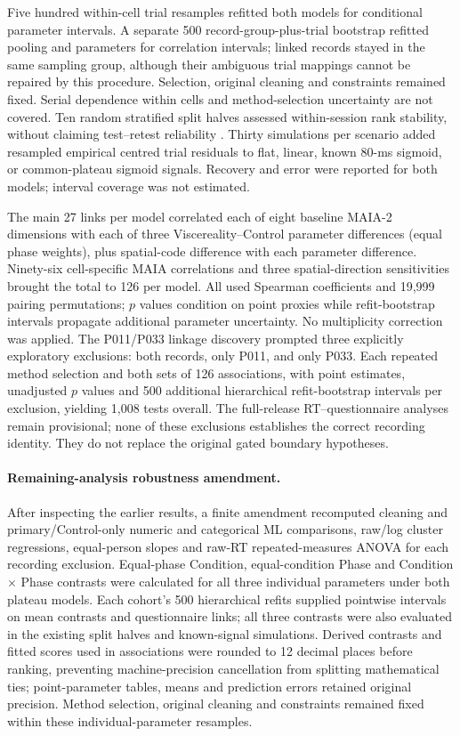 Five hundred within-cell trial resamples refitted both models for conditional parameter intervals. A separate 500 record-group-plus-trial bootstrap refitted pooling and parameters for correlation intervals; linked records stayed in the same sampling group, although their ambiguous trial mappings cannot be repaired by this procedure. Selection, original cleaning and constraints remained fixed. Serial dependence within cells and method-selection uncertainty are not covered. Ten random stratified split halves assessed within-session rank stability, without claiming test--retest reliability \citep{Hedge2018}. Thirty simulations per scenario added resampled empirical centred trial residuals to flat, linear, known 80-ms sigmoid, or common-plateau sigmoid signals. Recovery and error were reported for both models; interval coverage was not estimated.

The main 27 links per model correlated each of eight baseline MAIA-2 dimensions with each of three Viscereality--Control parameter differences (equal phase weights), plus spatial-code difference with each parameter difference. Ninety-six cell-specific MAIA correlations and three spatial-direction sensitivities brought the total to 126 per model. All used Spearman coefficients and 19{,}999 pairing permutations; $p$ values condition on point proxies while refit-bootstrap intervals propagate additional parameter uncertainty. No multiplicity correction was applied. The P011/P033 linkage discovery prompted three explicitly exploratory exclusions: both records, only P011, and only P033. Each repeated method selection and both sets of 126 associations, with point estimates, unadjusted $p$ values and 500 additional hierarchical refit-bootstrap intervals per exclusion, yielding 1,008 tests overall. The full-release RT--questionnaire analyses remain provisional; none of these exclusions establishes the correct recording identity. They do not replace the original gated boundary hypotheses.

\paragraph{Remaining-analysis robustness amendment.}
After inspecting the earlier results, a finite amendment recomputed cleaning and primary/Control-only numeric and categorical ML comparisons, raw/log cluster regressions, equal-person slopes and raw-RT repeated-measures ANOVA for each recording exclusion. Equal-phase Condition, equal-condition Phase and Condition $\times$ Phase contrasts were calculated for all three individual parameters under both plateau models. Each cohort's 500 hierarchical refits supplied pointwise intervals on mean contrasts and questionnaire links; all three contrasts were also evaluated in the existing split halves and known-signal simulations. Derived contrasts and fitted scores used in associations were rounded to 12 decimal places before ranking, preventing machine-precision cancellation from splitting mathematical ties; point-parameter tables, means and prediction errors retained original precision. Method selection, original cleaning and constraints remained fixed within these individual-parameter resamples.

